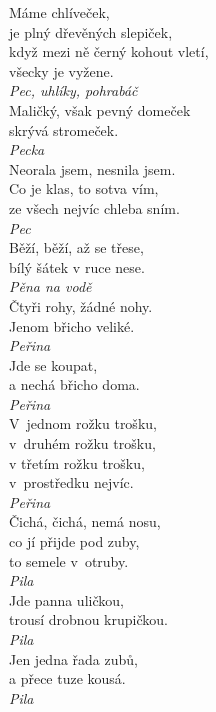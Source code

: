 \begin{multicols}{3}
\noindent
Máme chlíveček,\\
je plný dřevěných slepiček,\\
když mezi ně černý kohout vletí,\\
všecky je vyžene.\\[1 mm]
{\sl Pec, uhlíky, pohrabáč}\\

\noindent
Maličký, však pevný domeček\\
skrývá stromeček.\\[1 mm]
{\sl Pecka}\\

\noindent
Neorala jsem, nesnila jsem.\\
Co je klas, to sotva vím,\\
ze všech nejvíc chleba sním.\\[1 mm]
{\sl Pec}\\

\noindent
Běží, běží, až se třese,\\
bílý šátek v ruce nese.\\[1 mm]
{\sl Pěna na vodě}\\

\noindent
Čtyři rohy, žádné nohy.\\
Jenom břicho veliké.\\[1 mm]
{\sl Peřina}\\

\noindent
Jde se koupat,\\
a nechá břicho doma.\\[1 mm]
{\sl Peřina}\\

\noindent
V~jednom rožku trošku,\\
v~druhém rožku trošku,\\
v třetím rožku trošku,\\
v~prostředku nejvíc.\\[1 mm]
{\sl Peřina}\\

\noindent
Čichá, čichá, nemá nosu,\\
co jí přijde pod zuby,\\
to semele v~otruby.\\[1 mm]
{\sl Pila}\\

\noindent
Jde panna uličkou,\\
trousí drobnou krupičkou.\\[1 mm]
{\sl Pila}\\

\noindent
Jen jedna řada zubů,\\
a přece tuze kousá.\\[1 mm]
{\sl Pila}\\


\end{multicols}
